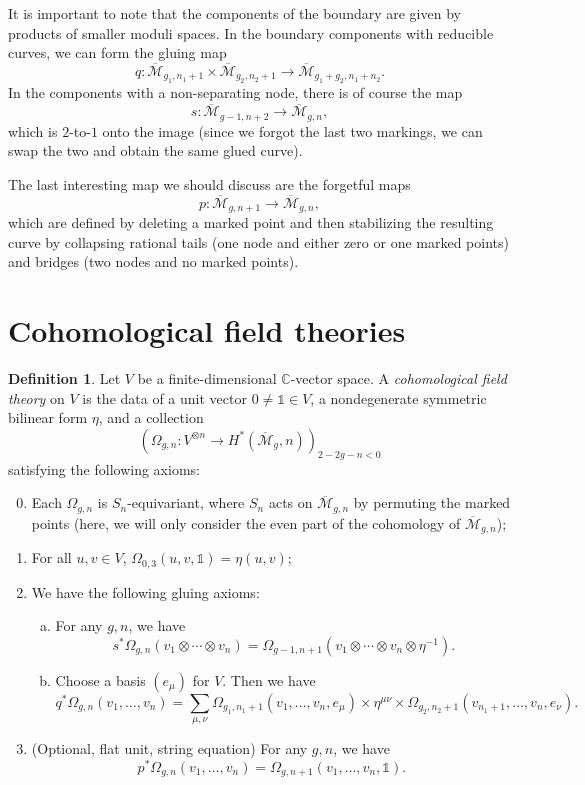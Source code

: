 \documentclass[leqno, openany]{memoir}
\theoremstyle{definition}
\newtheorem{defn}[thm]{Definition}
\theoremstyle{remark}
\theoremstyle{plain}
\theoremstyle{definition}
\theoremstyle{remark}
\newcommand{\C}{\mathbb{C}}
\newcommand{\mc}[1]{\mathcal{#1}}
\newcommand{\ol}[1]{\overline{#1}}
\begin{document}
It is important to note that the components of the boundary are given by products of smaller moduli spaces. In the boundary components with reducible curves, we can form the gluing map
\[ q \colon \ol{\mc{M}}_{g_1,n_1+1} \times \ol{\mc{M}}_{g_2, n_2+1} \to \ol{\mc{M}}_{g_1+g_2, n_1+n_2}. \]
In the components with a non-separating node, there is of course the map
\[ s \colon \ol{\mc{M}}_{g-1,n+2} \to \ol{\mc{M}}_{g,n}, \]
which is $2$-to-$1$ onto the image (since we forgot the last two markings, we can swap the two and obtain the same glued curve).

The last interesting map we should discuss are the forgetful maps
\[ p \colon \ol{\mc{M}}_{g,n+1} \to \ol{\mc{M}}_{g,n}, \]
which are defined by deleting a marked point and then stabilizing the resulting curve by collapsing rational tails (one node and either zero or one marked points) and bridges (two nodes and no marked points).

\section{Cohomological field theories}
\label{sec:cohft}

\begin{defn}
  Let $V$ be a finite-dimensional $\C$-vector space. A \textit{cohomological field theory} on $V$ is the data of a unit vector $0 \neq \mathbb{1} \in V$, a nondegenerate symmetric bilinear form $\eta$, and a collection
  \[ (\Omega_{g,n} \colon V^{\otimes n} \to H^{*}(\ol{\mc{M}}_g,n))_{2-2g-n < 0} \]
  satisfying the following axioms:
  \begin{enumerate}
    \setcounter{enumi}{-1}
  \item Each $\Omega_{g,n}$ is $S_n$-equivariant, where $S_n$ acts on $\ol{\mc{M}}_{g,n}$ by permuting the marked points (here, we will only consider the even part of the cohomology of $\ol{\mc{M}}_{g,n}$);
  \item For all $u, v \in V$, $\Omega_{0,3}(u,v,\mathbb{1}) = \eta(u,v)$;
  \item We have the following gluing axioms: \begin{enumerate}[(a)]
    \item For any $g,n$, we have
      \[ s^* \Omega_{g,n}(v_1 \otimes \cdots \otimes v_n) = \Omega_{g-1,n+1}(v_1 \otimes \cdots \otimes v_n \otimes \eta^{-1}). \]
    \item Choose a basis $(e_{\mu})$ for $V$. Then we have
      \[ q^* \Omega_{g,n}(v_1, \ldots, v_n) = \sum_{\mu,\nu} \Omega_{g_1,n_1+1}(v_1, \ldots,v_n, e_{\mu}) \times \eta^{\mu\nu} \times \Omega_{g_2, n_2+1}(v_{n_1+1}, \ldots, v_n, e_{\nu}). \]
    \end{enumerate}
  \item (Optional, flat unit, string equation) For any $g, n$, we have
    \[ p^*\Omega_{g,n}(v_1, \ldots, v_n) = \Omega_{g,n+1}(v_1, \ldots, v_n, \mathbb{1}). \]
  \end{enumerate}
\end{defn}
\end{document}
